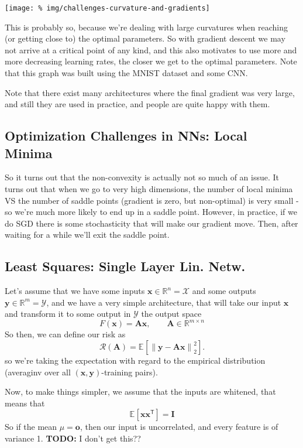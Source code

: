 \documentclass[a2paper,4pt]{extarticle}
\newcommand{\R}{\mathbb{R}}
\newcommand{\cR}{\mathcal{R}}
\newcommand{\cX}{\mathcal{X}}
\newcommand{\cY}{\mathcal{Y}}
\newcommand{\norm}[1]{\left\lVert #1 \right\rVert}
\newcommand{\Exp}[2][]{{\mathbb{E}_{#1}}\left[ #2
\right]}
\newcommand*{\T}{\mathsf{T}}
\newcommand{\mat}[1]{\mathbf{#1}}
\renewcommand{\vec}[1]{\mathbf{#1}}
\newcommand{\vo}{\vec{o}}
\newcommand{\vx}{\vec{x}}
\newcommand{\vy}{\vec{y}}
\newcommand{\MA}{\mat{A}}
\newcommand{\MI}{\mat{I}}
\newcommand{\todo}[1]{\textbf{TODO:} #1}
\newcommand{\todo}[1]{%
}
\newcommand{\ssep}{\hdashrule[1.1ex]{\linewidth}{0.1pt}{0.3mm}\vspace{-6pt}}
\newcommand{\ssep}{\hdashrule[1.1ex]{\linewidth}{0.1pt}{0.3mm}\vspace{-3pt}}
\begin{document}
\begin{landscape}
\begin{multicols*}{7}
\begin{center}
  \texttt{[image: \%
img/challenges-curvature-and-gradients]}
\end{center}

This is probably so, because we're dealing with large curvatures when reaching
(or getting close to) the optimal parameters. So with gradient descent we may
not arrive at a critical point of any kind, and this also motivates to use more
and more decreasing learning rates, the closer we get to the optimal parameters.
Note that this graph was built using the MNIST dataset and some CNN.

Note that there exist many architectures where the final gradient was very
large, and still they are used in practice, and people are quite happy with
them.

\subsection{Optimization Challenges in NNs: Local Minima}


So it turns out that the non-convexity is actually not so much of an issue. It
turns out that when we go to very high dimensions, the number of local minima VS
the number of saddle points (gradient is zero, but non-optimal) is very small -
so we're much more likely to end up in a saddle point. However, in practice, if
we do SGD there is some stochasticity that will make our gradient move. Then,
after waiting for a while we'll exit the saddle point.


\subsection{Least Squares: Single Layer Lin. Netw.}

Let's assume that we have some inputs $\vx\in\R^n=\cX$ and some outputs
$\vy\in\R^m=\cY$, and we have a very simple architecture, that will take our
input $\vx$ and transform it to some output in $\cY$ the output space
\[
F(\vx)=\MA\vx, \qquad \MA\in\R^{m\times n}
\]
So then, we can define our risk as
\[
\cR(\MA)=\Exp{\norm{\vy-\MA\vx}_2^2}.
\]
so we're taking the expectation with regard to the empirical distribution
(averaginv over all $(\vx,\vy)$-training pairs).

\ssep

Now, to make things simpler, we assume that the inputs are whitened, that means
that
\[
\Exp{\vx\vx^\T}=\MI
\]
So if the mean $\mu=\vo$, then our input is uncorrelated, and every feature is
of variance 1.
\todo{I don't get this??}


\end{multicols*}
\end{landscape}
\end{document}
